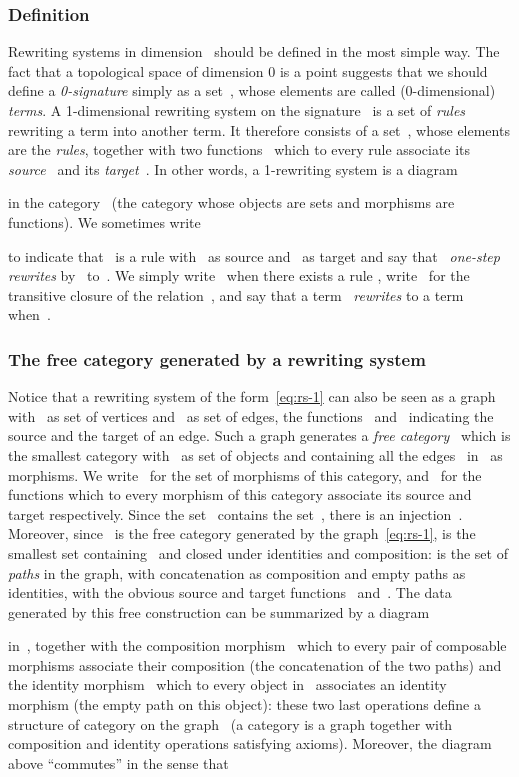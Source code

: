\documentclass{LMCS}
\begin{document}
\subsubsection{Definition}
Rewriting systems in dimension~ should be defined in the most simple way. The
fact that a topological space of dimension 0 is a point suggests that we should
define a \emph{0-signature} simply as a set~, whose elements are called
(0-dimensional) \emph{terms}. A 1-dimensional rewriting system on the
signature~ is a set of \emph{rules} rewriting a term into another term. It
therefore consists of a set~, whose elements are the \emph{rules}, together
with two functions~ which to every rule  associate its
\emph{source}~ and its \emph{target}~. In other words, a 1-rewriting
system is a diagram

in the category~ (the category whose objects are sets and morphisms are
functions). We sometimes write

to indicate that~ is a rule with~ as source and~ as target and say
that~ \emph{one-step rewrites} by~ to~. We simply write~ when
there exists a rule , write~ for the transitive closure of the
relation~, and say that a term~ \emph{rewrites} to a term~
when~.

\subsubsection{The free category generated by a rewriting system}
\label{sec:rs-1-fcat}
Notice that a rewriting system of the form~\eqref{eq:rs-1} can also be seen as a
graph with~ as set of vertices and~ as set of edges, the functions~
and~ indicating the source and the target of an edge. Such a graph generates
a \emph{free category}~ which is the smallest category with~ as set of
objects and containing all the edges~ in~ as morphisms. We
write~ for the set of morphisms of this category, and~ for the functions which to every morphism of this category associate its
source and target respectively. Since the set~ contains the set~,
there is an injection~. Moreover, since~ is the free
category generated by the graph~\eqref{eq:rs-1},  is the smallest set
containing~ and closed under identities and composition:  is the set
of \emph{paths} in the graph, with concatenation as composition and empty paths
as identities, with the obvious source and target functions~
and~. The data generated by this free construction can be summarized by a
diagram

in~, together with the composition morphism~ which to every pair of composable morphisms associate their composition
(\ie the concatenation of the two paths) and the identity morphism~ which to every object in~ associates an identity morphism (\ie the
empty path on this object): these two last operations define a structure of
category on the
graph~
(a category is a graph together with composition and identity operations
satisfying axioms).
Moreover, the diagram above ``commutes'' in the sense that
\end{document}
